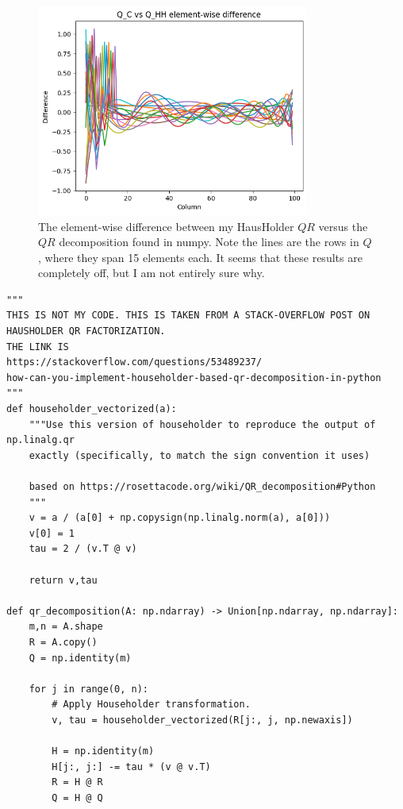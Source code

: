 \begin{solution}
\begin{figure}[ht]
    \centering
    \includegraphics[width=0.8\textwidth]{Images/Q_C vs Q_HH.png}
    \caption{The element-wise difference between my HausHolder $QR$ versus the $QR$ decomposition found in numpy. Note the lines are the rows in $Q$, where they span 15 elements each. It seems that these results are completely off, but I am not entirely sure why.}
    \label{fig:p6e Q_HH difference}
\end{figure}

\clearpage
\begin{lstlisting}
"""
THIS IS NOT MY CODE. THIS IS TAKEN FROM A STACK-OVERFLOW POST ON HAUSHOLDER QR FACTORIZATION. 
THE LINK IS 
https://stackoverflow.com/questions/53489237/
how-can-you-implement-householder-based-qr-decomposition-in-python
"""
def householder_vectorized(a):
    """Use this version of householder to reproduce the output of np.linalg.qr 
    exactly (specifically, to match the sign convention it uses)
    
    based on https://rosettacode.org/wiki/QR_decomposition#Python
    """
    v = a / (a[0] + np.copysign(np.linalg.norm(a), a[0]))
    v[0] = 1
    tau = 2 / (v.T @ v)
    
    return v,tau

def qr_decomposition(A: np.ndarray) -> Union[np.ndarray, np.ndarray]:
    m,n = A.shape
    R = A.copy()
    Q = np.identity(m)
    
    for j in range(0, n):
        # Apply Householder transformation.
        v, tau = householder_vectorized(R[j:, j, np.newaxis])
        
        H = np.identity(m)
        H[j:, j:] -= tau * (v @ v.T)
        R = H @ R
        Q = H @ Q
        

\end{lstlisting}
\end{solution}
